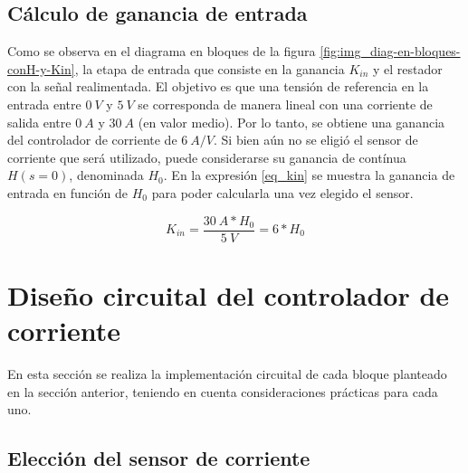 \subsection{Cálculo de ganancia de entrada}

Como se observa en el diagrama en bloques de la figura \ref{fig:img_diag-en-bloques-conH-y-Kin}, la etapa de entrada que consiste en la ganancia $K_{in}$ y el restador con la señal realimentada. El objetivo es que una tensión de referencia en la entrada entre $0\:V$ y $5\:V$ se corresponda de manera lineal con una corriente de salida entre $0\:A$ y $30\:A$ (en valor medio). Por lo tanto, se obtiene una ganancia del controlador de corriente de $6\:A/V$. Si bien aún no se eligió el sensor de corriente que será utilizado, puede considerarse su ganancia de contínua $H(s=0)$, denominada $H_0$. En la expresión \ref{eq_kin} se muestra la ganancia de entrada en función de $H_0$ para poder calcularla una vez elegido el sensor.

\begin{equation} \label{eq_kin}
	K_{in}=\frac{30\:A*H_0}{5\:V}=6*H_0 
\end{equation}

%
%
\section{Diseño circuital del controlador de corriente}

En esta sección se realiza la implementación circuital de cada bloque planteado en la sección anterior, teniendo en cuenta consideraciones prácticas para cada uno.


\subsection{Elección del sensor de corriente}

